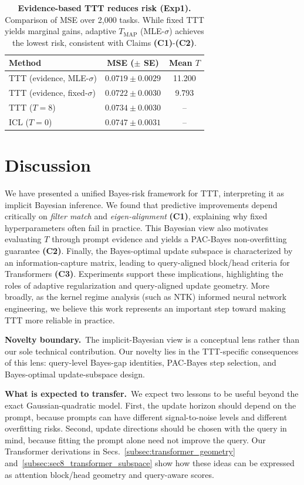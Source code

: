 \documentclass{article}
\theoremstyle{plain}
\theoremstyle{definition}
\theoremstyle{remark}
\begin{document}
\begin{table}[t]
\centering
\small
\begin{tabular}{lcc}
\toprule
Method & MSE ($\pm$ SE) & Mean $T$ \\
\midrule
TTT (evidence, MLE-$\sigma$)  & $0.0719 \pm 0.0029$ & 11.200 \\
TTT (evidence, fixed-$\sigma$)& $0.0722 \pm 0.0030$ & 9.793 \\
TTT ($T{=}8$)           & $0.0734 \pm 0.0030$ & -- \\
ICL ($T{=}0$)               & $0.0747 \pm 0.0031$ & -- \\
\bottomrule
\end{tabular}
\caption{\textbf{Evidence-based TTT reduces risk (Exp1).} Comparison of MSE over 2{,}000 tasks. While fixed TTT yields marginal gains, adaptive $T_{\mathrm{MAP}}$ (MLE-$\sigma$) achieves the lowest risk, consistent with Claims \textbf{(C1)}-\textbf{(C2)}.}
\label{tab:exp1_summary}
\end{table}

\section{Discussion}\label{sec:conclusion}

We have presented a unified Bayes-risk framework for TTT, interpreting it as implicit Bayesian inference. We found that predictive improvements depend critically on \emph{filter match} and \emph{eigen-alignment} \textbf{(C1)}, explaining why fixed hyperparameters often fail in practice. This Bayesian view also motivates evaluating $T$ through prompt evidence and yields a PAC-Bayes non-overfitting guarantee \textbf{(C2)}. Finally, the Bayes-optimal update subspace is characterized by an information-capture matrix, leading to query-aligned block/head criteria for Transformers \textbf{(C3)}. Experiments support these implications, highlighting the roles of adaptive regularization and query-aligned update geometry. More broadly, as the kernel regime analysis (such as NTK) informed neural network engineering, we believe this work represents an important step toward making TTT more reliable in practice.

\textbf{Novelty boundary.}\,
The implicit-Bayesian view is a conceptual lens rather than our sole technical contribution. Our novelty lies in the TTT-specific consequences of this lens: query-level Bayes-gap identities, PAC-Bayes step selection, and Bayes-optimal update-subspace design.

\textbf{What is expected to transfer.}\,
We expect two lessons to be useful beyond the exact Gaussian-quadratic model. First, the update horizon should depend on the prompt, because prompts can have different signal-to-noise levels and different overfitting risks. Second, update directions should be chosen with the query in mind, because fitting the prompt alone need not improve the query. Our Transformer derivations in Secs.~\ref{subsec:transformer_geometry} and~\ref{subsec:sec8_transformer_subspace} show how these ideas can be expressed as attention block/head geometry and query-aware scores.
\end{document}
